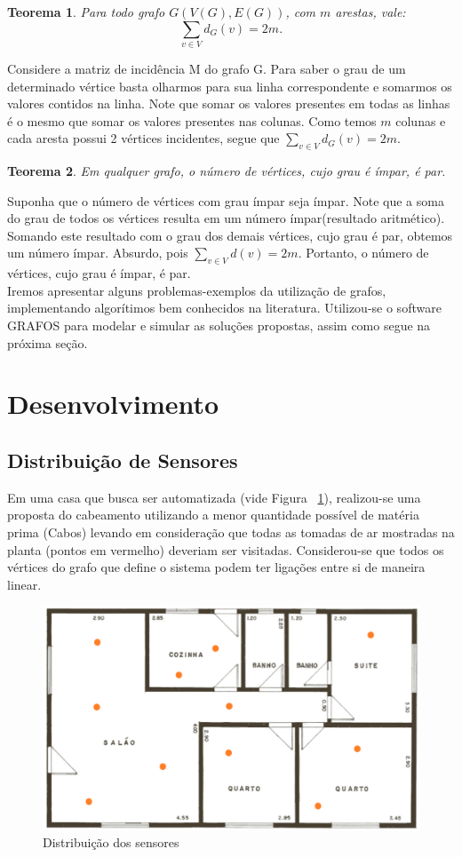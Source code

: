 \documentclass[a4paper,12pt]{article}
\newtheorem{teorema}{Teorema}[section]
\begin{document}
\begin{teorema}
	Para todo grafo $G(V(G),E(G))$, com $m$ arestas, vale:
	$$
	\sum\limits_{v\in V}{d_{G}(v)=2m}.
	$$
\end{teorema}
 Considere a matriz de incidência M do grafo G. Para saber o grau de um determinado vértice basta olharmos para sua linha correspondente e somarmos os valores contidos na linha. Note que somar os valores presentes em todas as linhas é o mesmo que somar os valores presentes nas colunas. Como temos $m$ colunas e cada aresta possui 2 vértices incidentes, segue que $\sum\limits_{v\in V}{d_{G}(v)=2m}$.

\begin{teorema}
	Em qualquer grafo, o número de vértices, cujo grau é ímpar, é par.
\end{teorema}
 Suponha que o número de vértices com grau ímpar seja ímpar. Note que a soma do grau de todos os vértices resulta em um número ímpar(resultado aritmético). Somando este resultado com o grau dos demais vértices, cujo grau é par, obtemos um número ímpar. Absurdo, pois $\sum\limits_{v\in V}{d(v)=2m}$. Portanto, o número de vértices, cujo grau é ímpar, é par.
 \\

Iremos apresentar alguns problemas-exemplos da utilização de grafos, implementando algorítimos bem conhecidos na literatura. Utilizou-se o software GRAFOS \cite{grafos} para modelar e simular as soluções propostas, assim como segue na próxima seção.

\section{Desenvolvimento}
\subsection{Distribuição de Sensores}
 Em uma casa que busca ser automatizada (vide Figura ~\ref{fig:sensores}), realizou-se uma proposta do cabeamento utilizando a menor quantidade possível de matéria prima (Cabos) levando em consideração que todas as tomadas de ar mostradas na planta (pontos em vermelho) deveriam ser visitadas. Considerou-se que todos os vértices do grafo que define o sistema podem ter ligações entre si de maneira linear.
 
\begin{figure}[H]
	\begin{center}
		\includegraphics[width=0.8\linewidth]{sensores.png}
	\end{center}
	\caption{Distribuição dos sensores}
	\label{fig:sensores}
\end{figure}
\end{document}
